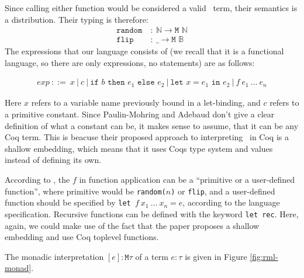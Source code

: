 \documentclass[11pt, leqno, titlepage]{article}
\theoremstyle{definition}
\begin{document}
Since calling either function would be considered a valid \rml\ term, their semantics
is a distribution. Their typing is therefore:
\begin{align*}
  \texttt{random} &~:~\mathbb{N} \to \texttt{M }\mathbb{N}\\
  \texttt{flip}   &~:~ \_ \to \texttt{M }\mathbb{B}
\end{align*}
\noindent The expressions that our language consists of (we recall that it is a functional
language, so there are only expressions, no statements) are as follows:

\begin{align*}
  exp~::= ~ x~\vert ~ c~\vert ~ \texttt{if }b\texttt{ then }e_1\texttt{ else } e_2~
  \vert ~ \texttt{let }x = e_1 \texttt{ in }e_2~\vert ~ f~e_1~\dots~e_n
\end{align*}

Here $x$ refers to a variable name previously bound in a let-binding, and $c$ refers
to a primitive constant. Since Paulin-Mohring and Adebaud don't give a clear
definition of what a constant can be, it makes sense to assume, that it can be any
Coq term. This is beacuse their proposed approach to interpreting \rml\ in Coq is a
shallow embedding, which means that it uses Coqs type system and values instead of
defining its own. 

According to \cite{rml-paper}, the $f$ in function application can be a ``primitive
or a user-defined function'', where primitive would be \texttt{random($n$)} or
\texttt{flip}, and a user-defined function should be specified by \texttt{let
}$f~x_1~\dots~ x_n= e$, according to the language specification. Recursive functions
can be defined with the keyword \texttt{let rec}. Here, again, we could make use of
the fact that the paper proposes a shallow embedding and use Coq toplevel functions. 

The monadic interpretation $[e]:\texttt{M}\tau$ of a term $e:\tau$ is given in
Figure \ref{fig:rml-monad}.
\end{document}
